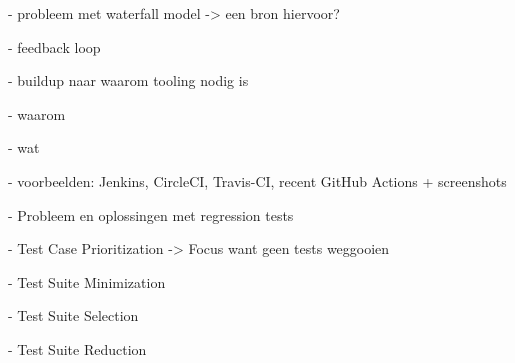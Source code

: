 - probleem met waterfall model -> een bron hiervoor?

- feedback loop

- buildup naar waarom tooling nodig is

- waarom

- wat

- voorbeelden: Jenkins, CircleCI, Travis-CI, recent GitHub Actions + screenshots

- Probleem en oplossingen met regression tests

  - Test Case Prioritization -> Focus want geen tests weggooien
  
  - Test Suite Minimization
  
  - Test Suite Selection
  
  - Test Suite Reduction
